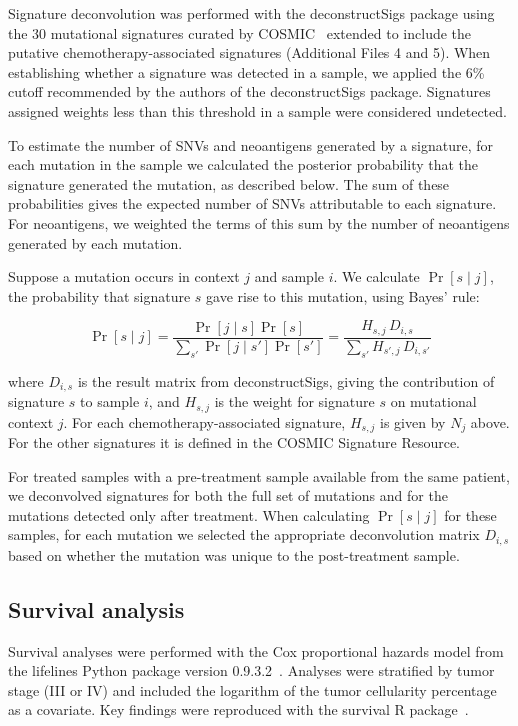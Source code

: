 \documentclass[linenumbers]{bmcart}
\begin{document}

Signature deconvolution was performed with the deconstructSigs\cite{Rosenthal_2016} package using the 30 mutational signatures curated by COSMIC~\cite{364242} extended to include the putative chemotherapy-associated signatures (Additional Files 4 and 5). When establishing whether a signature was detected in a sample, we applied the 6\% cutoff recommended by the authors of the deconstructSigs package. Signatures assigned weights less than this threshold in a sample were considered undetected.


To estimate the number of SNVs and neoantigens generated by a signature, for each mutation in the sample we calculated the posterior probability that the signature generated the mutation, as described below. The sum of these probabilities gives the expected number of SNVs attributable to each signature. For neoantigens, we weighted the terms of this sum by the number of neoantigens generated by each mutation.

Suppose a mutation occurs in context $j$ and sample $i$. We calculate $\Pr[s \mid j]$, the probability that signature $s$ gave rise to this mutation, using Bayes' rule:

\[
\Pr[s \mid j] = \frac{\Pr[j \mid s] \Pr[s]}{\sum_{s'}{\Pr[j \mid s']\Pr[s']}} = \frac{H_{s,j} \, D_{i,s}}{\sum_{s'}{H_{s',j} \, D_{i,s'}}}
\]

where $D_{i,s}$ is the result matrix from deconstructSigs, giving the contribution of signature $s$ to sample $i$, and $H_{s,j}$ is the weight for signature $s$ on mutational context $j$. For each chemotherapy-associated signature, $H_{s,j}$ is given by $N_j$ above. For the other signatures it is defined in the COSMIC Signature Resource.

For treated samples with a pre-treatment sample available from the same patient, we deconvolved signatures for both the full set of mutations and for the mutations detected only after treatment. When calculating $\Pr[s \mid j]$ for these samples, for each mutation we selected the appropriate deconvolution matrix $D_{i,s}$ based on whether the mutation was unique to the post-treatment sample.

\subsection*{Survival analysis}
Survival analyses were performed with the Cox proportional hazards model from the lifelines Python package version 0.9.3.2~\cite{cameron2017}. Analyses were stratified by tumor stage (III or IV) and included the logarithm of the tumor cellularity percentage as a covariate. Key findings were reproduced with the survival R package~\cite{survivalpackage}.
\end{document}

